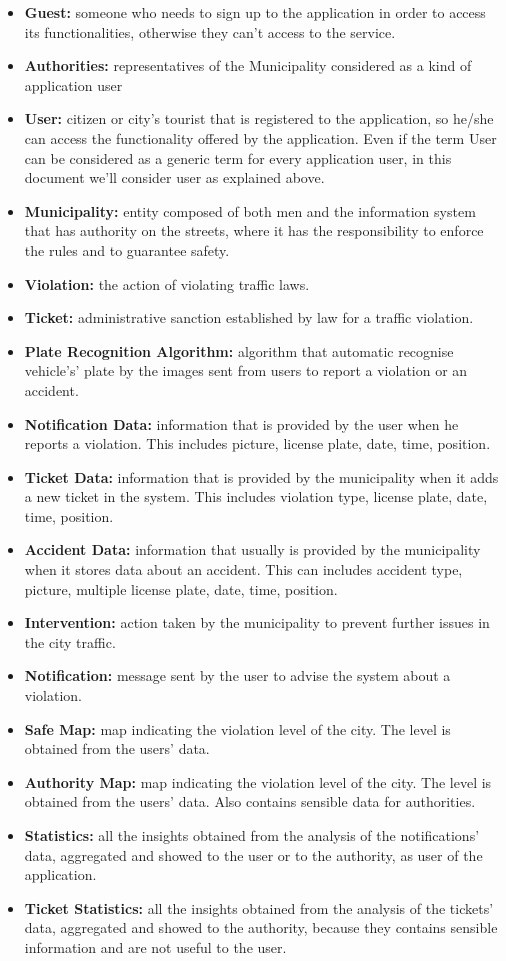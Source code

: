 \documentclass {article}
\begin{document}
			\begin{itemize}
				\item {\bf Guest:} someone who needs to sign up to the application in order to access its functionalities, otherwise they can't access to the service.
				\item {\bf Authorities:} representatives of the Municipality considered as a kind of application user
				\item {\bf User:} citizen or city's tourist that is registered to the application, so he/she can access the functionality offered by the application. Even if the term User can be considered as a generic term for every application user, in this document we'll consider user as explained above.
				\item {\bf Municipality:} entity composed of both men and the information system that has authority on the streets, where it has the responsibility to enforce the rules and to guarantee safety. 
				\item {\bf Violation:} the action of violating traffic laws.
				\item {\bf Ticket:} administrative sanction established 	by law for a traffic violation.
				\item {\bf Plate Recognition Algorithm:} algorithm that 	automatic recognise vehicle's' plate by the images sent from users to report a violation or an accident.
				\item {\bf Notification Data:} information that is provided by the user when he reports a violation. This includes picture, license plate, date, time, position.
				\item {\bf Ticket Data:} information that is provided by the municipality when it adds a new ticket in the system. This includes violation type, license plate, date, time, position.
				\item {\bf Accident Data:} information that usually is provided by the municipality when it stores data about an accident. This can includes accident type, picture, multiple license plate, date, time, position.
				\item {\bf Intervention:} action taken by the municipality to prevent further issues in the city traffic.
				\item {\bf Notification:} message sent by the user to 						advise the system about a violation.
				\item {\bf Safe Map:} map indicating the violation level of the city. The level is obtained from the users' data.
				\item {\bf Authority Map:} map indicating the violation level of the city. The level is obtained from the users' data. Also contains sensible data for authorities. 
				\item {\bf Statistics:} all the insights obtained from the analysis of the notifications' data, aggregated and showed to the user or to the authority, as user of the application.  
				\item {\bf Ticket Statistics:} all the insights obtained from the analysis of the tickets' data, aggregated and showed to the authority, because they contains sensible information and are not useful to the user.
			\end{itemize}
		
\end{document}
